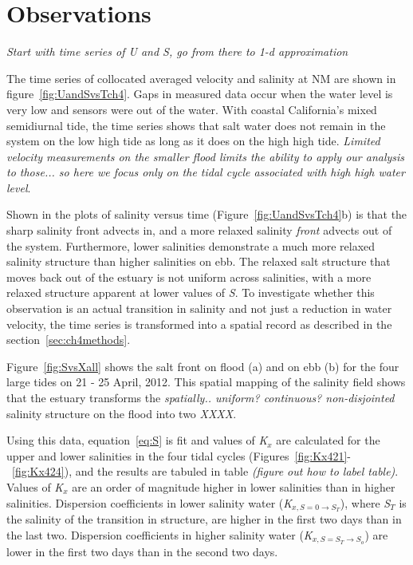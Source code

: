 \section{Observations}
\emph{Start with time series of U and S, go from there to 1-d approximation}

The time series of collocated averaged velocity and salinity at NM are shown in figure~\ref{fig:UandSvsTch4}. Gaps in measured data occur when the water level is very low and sensors were out of the water. With coastal California's mixed semidiurnal tide, the time series shows that salt water does not remain in the system on the low high tide as long as it does on the high high tide. \emph{Limited velocity measurements on the smaller flood limits the ability to apply our analysis to those... so here we focus only on the tidal cycle associated with high high water level}. 

Shown in the plots of salinity versus time (Figure~\ref{fig:UandSvsTch4}b) is that the sharp salinity front advects in, and a more relaxed salinity \emph{front} advects out of the system. Furthermore, lower salinities demonstrate a much more relaxed salinity structure than higher salinities on ebb. The relaxed salt structure that moves back out of the estuary is not uniform across salinities, with a more relaxed structure apparent at lower values of \emph{S}. To investigate whether this observation is an actual transition in salinity and not just a reduction in water velocity, the time series is transformed into a spatial record as described in the section~\ref{sec:ch4methods}. 

Figure~\ref{fig:SvsXall} shows the salt front on flood (a) and on ebb (b) for the four large tides on 21 - 25 April, 2012. This spatial mapping of the salinity field shows that the estuary transforms the \emph{spatially.. uniform? continuous? non-disjointed} salinity structure on the flood into two \emph{XXXX}. 

Using this data, equation~\ref{eq:S} is fit and values of \emph{K$_x$} are calculated for the upper and lower salinities in the four tidal cycles (Figures~\ref{fig:Kx421}-~\ref{fig:Kx424}), and the results are tabuled in table \emph{(figure out how to label table)}. Values of \emph{K$_x$} are an order of magnitude higher in lower salinities than in higher salinities. Dispersion coefficients in lower salinity water (\emph{K$_{x,S=0 \rightarrow S_T}$}), where \emph{S$_T$} is the salinity of the transition in structure, are higher in the first two days than in the last two. Dispersion coefficients in higher salinity water (\emph{K$_{x,S=S_T \rightarrow S_o}$}) are lower in the first two days than in the second two days. 

